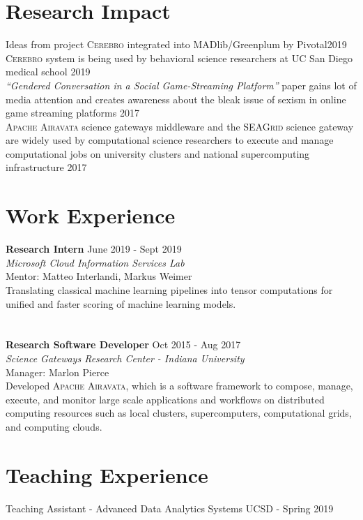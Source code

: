\documentclass[margin]{res}
\begin{document}
\begin{resume}
\section{Research Impact}
Ideas from project \textsc{Cerebro} integrated into MADlib/Greenplum by Pivotal\hfill 2019\\
\textsc{Cerebro} system is being used by behavioral science researchers at UC San Diego medical school \hfill 2019\\
\textit{``Gendered Conversation in a Social Game-Streaming Platform''} paper gains lot of media attention and creates awareness about the bleak issue of sexism in online game streaming platforms \hfill 2017\\
\textsc{Apache Airavata} science gateways middleware and the \textsc{SEAGrid} science gateway are widely used by computational science researchers to execute and manage computational jobs on university clusters and national supercomputing infrastructure \hfill 2017

\section{Work Experience}

\textbf{Research Intern}
\hfill June 2019 - Sept 2019 \\
\textit{Microsoft Cloud Information Services Lab} \\
Mentor: Matteo Interlandi, Markus Weimer\\
Translating classical machine learning pipelines into tensor computations for unified and faster scoring of machine learning models.\\\\\\


\textbf{Research Software Developer}
\hfill Oct 2015 - Aug 2017 \\
\textit{Science Gateways Research Center - Indiana University} \\
Manager: Marlon Pierce\\
Developed \textsc{Apache Airavata}, which is a software framework to compose, manage, execute, and monitor large scale applications and workflows on distributed computing resources such as local clusters, supercomputers, computational grids, and computing clouds.



\section{Teaching Experience}
Teaching Assistant - Advanced Data Analytics Systems \hfill UCSD - Spring 2019




\end{resume}
\end{document}
